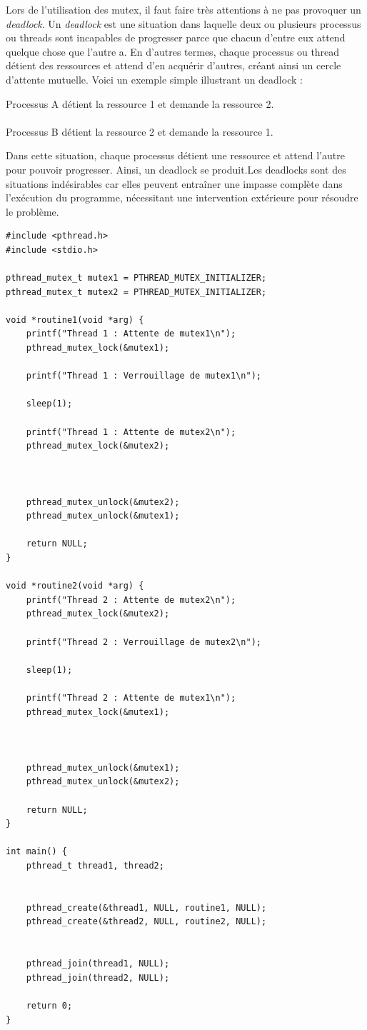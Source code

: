 Lors de l'utilisation des mutex, il faut faire très attentions à ne pas provoquer un \textit{deadlock}. Un \textit{deadlock} est une situation dans laquelle deux ou plusieurs processus ou threads sont incapables de progresser parce que chacun d'entre eux attend quelque chose que l'autre a. En d'autres termes, chaque processus ou thread détient des ressources et attend d'en acquérir d'autres, créant ainsi un cercle d'attente mutuelle.
Voici un exemple simple illustrant un deadlock :
\begin{mdframed}    
Processus A détient la ressource 1 et demande la ressource 2.\\
\\
Processus B détient la ressource 2 et demande la ressource 1.
\end{mdframed}
Dans cette situation, chaque processus détient une ressource et attend l'autre pour pouvoir progresser. Ainsi, un deadlock se produit.Les deadlocks sont des situations indésirables car elles peuvent entraîner une impasse complète dans l'exécution du programme, nécessitant une intervention extérieure pour résoudre le problème. 
\vspace{\baselineskip}
\begin{lstlisting}[title = Code deadlock]
#include <pthread.h>
#include <stdio.h>

pthread_mutex_t mutex1 = PTHREAD_MUTEX_INITIALIZER;
pthread_mutex_t mutex2 = PTHREAD_MUTEX_INITIALIZER;

void *routine1(void *arg) {
    printf("Thread 1 : Attente de mutex1\n");
    pthread_mutex_lock(&mutex1);

    printf("Thread 1 : Verrouillage de mutex1\n");
    
    sleep(1);

    printf("Thread 1 : Attente de mutex2\n");
    pthread_mutex_lock(&mutex2);



    pthread_mutex_unlock(&mutex2);
    pthread_mutex_unlock(&mutex1);

    return NULL;
}

void *routine2(void *arg) {
    printf("Thread 2 : Attente de mutex2\n");
    pthread_mutex_lock(&mutex2);

    printf("Thread 2 : Verrouillage de mutex2\n");

    sleep(1);

    printf("Thread 2 : Attente de mutex1\n");
    pthread_mutex_lock(&mutex1);



    pthread_mutex_unlock(&mutex1);
    pthread_mutex_unlock(&mutex2);

    return NULL;
}

int main() {
    pthread_t thread1, thread2;


    pthread_create(&thread1, NULL, routine1, NULL);
    pthread_create(&thread2, NULL, routine2, NULL);


    pthread_join(thread1, NULL);
    pthread_join(thread2, NULL);

    return 0;
}
\end{lstlisting}   
\vspace{\baselineskip}

